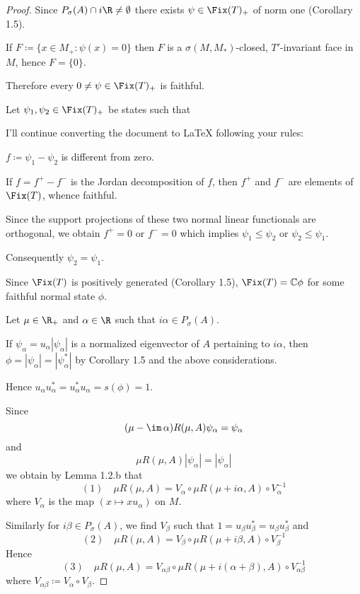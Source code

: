\begin{proof}
Since $P_{\sigma}(A) \cap i\R \neq \emptyset$ there exists $\psi \in \Fix(T)_{+}$ of norm one (Corollary 1.5).

If $F \coloneqq \{x \in M_{+} \colon \psi(x) = 0\}$ then $F$ is a $\sigma(M,M_{*})$-closed, $T'$-invariant face in $M$, hence $F = \{0\}$.

Therefore every $0 \neq \psi \in \Fix(T)_{+}$ is faithful.

Let $\psi_{1}, \psi_{2} \in \Fix(T)_{+}$ be states such that


I'll continue converting the document to LaTeX following your rules:

$f \coloneqq \psi_{1} - \psi_{2}$ is different from zero.

If $f = f^{+} - f^{-}$ is the Jordan decomposition of $f$, then $f^{+}$ and $f^{-}$ are elements of $\Fix(T)$, whence faithful.

Since the support projections of these two normal linear functionals are orthogonal, we obtain $f^{+} = 0$ or $f^{-} = 0$ which implies $\psi_{1} \leq \psi_{2}$ or $\psi_{2} \leq \psi_{1}$.

Consequently $\psi_{2} = \psi_{1}$.

Since $\Fix(T)$ is positively generated (Corollary 1.5), $\Fix(T) = \mathbb{C}\phi$ for some faithful normal state $\phi$.

Let $\mu \in \R_{+}$ and $\alpha \in \R$ such that $i\alpha \in P_{\sigma}(A)$.

If $\psi_{\alpha} = u_{\alpha}|\psi_{\alpha}|$ is a normalized eigenvector of $A$ pertaining to $i\alpha$, then $\phi = |\psi_{\alpha}| = |\psi_{\alpha}^{*}|$ by Corollary 1.5 and the above considerations.

Hence $u_{\alpha}u_{\alpha}^{*} = u_{\alpha}^{*}u_{\alpha} = s(\phi) = 1$.

Since
\[
(\mu - \im\,\alpha)R(\mu,A)\psi_{\alpha} = \psi_{\alpha}
\]
and
\[
\mu R(\mu,A)|\psi_{\alpha}| = |\psi_{\alpha}|
\]
we obtain by Lemma 1.2.b that
\[
(1) \quad \mu R(\mu,A) = V_{\alpha} \circ \mu R(\mu+i\alpha,A) \circ V_{\alpha}^{-1}
\]
where $V_{\alpha}$ is the map $(x \mapsto xu_{\alpha})$ on $M$.

Similarly for $i\beta \in P_{\sigma}(A)$, we find $V_{\beta}$ such that $1 = u_{\beta}u_{\beta}^{*} = u_{\beta}u_{\beta}^{*}$ and
\[
(2) \quad \mu R(\mu,A) = V_{\beta} \circ \mu R(\mu+i\beta,A) \circ V_{\beta}^{-1}
\]
Hence
\[
(3) \quad \mu R(\mu,A) = V_{\alpha\beta} \circ \mu R(\mu+i(\alpha+\beta),A) \circ V_{\alpha\beta}^{-1}
\]
where $V_{\alpha\beta} \coloneqq V_{\alpha} \circ V_{\beta}$.


\end{proof}
